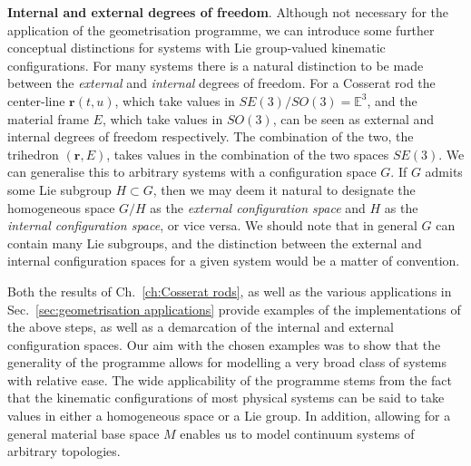 \textbf{Internal and external degrees of freedom}. Although not necessary for the application of the geometrisation programme, we can introduce some further conceptual distinctions for systems with Lie group-valued kinematic configurations. For many systems there is a natural distinction to be made between the \textit{external} and \textit{internal} degrees of freedom. For a Cosserat rod the center-line $\mathbf{r}(t,u)$, which take values in $SE(3) / SO(3) = \mathbb{E}^3$, and the material frame $E$, which take values in $SO(3)$, can be seen as external and internal degrees of freedom respectively. The combination of the two, the trihedron $(\mathbf{r}, E)$, takes values in the combination of the two spaces $SE(3)$. We can generalise this to arbitrary systems with a configuration space $G$. If $G$ admits some Lie subgroup $H \subset G$, then we may deem it natural to designate the homogeneous space $G/H$ as the \textit{external configuration space} and $H$ as the \textit{internal configuration space}, or vice versa. We should note that in general $G$ can contain many Lie subgroups, and the distinction between the external and internal configuration spaces for a given system would be a matter of convention.

Both the results of Ch.~\ref{ch:Cosserat rods}, as well as the various applications in Sec.~\ref{sec:geometrisation applications} provide examples of the implementations of the above steps, as well as a demarcation of the internal and external configuration spaces. Our aim with the chosen examples was to show that the generality of the programme allows for modelling a very broad class of systems with relative ease. The wide applicability of the programme stems from the fact that the kinematic configurations of most physical systems can be said to take values in either a homogeneous space or a Lie group. In addition, allowing for a general material base space $M$ enables us to model continuum systems of arbitrary topologies. 

